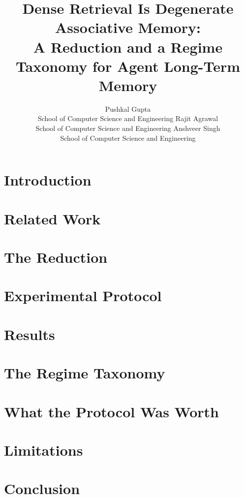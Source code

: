 \documentclass[10pt]{article}
\title{Dense Retrieval Is Degenerate Associative Memory:\\
       A Reduction and a Regime Taxonomy for Agent Long-Term Memory}
\author{\name Pushkal Gupta \\
        \addr School of Computer Science and Engineering
        \AND
        \name Rajit Agrawal \\
        \addr School of Computer Science and Engineering
        \AND
        \name Anshveer Singh \\
        \addr School of Computer Science and Engineering}
\theoremstyle{definition}
\theoremstyle{remark}
\begin{document}
\maketitle

\begin{abstract}

\end{abstract}

\section{Introduction}


\section{Related Work}


\section{The Reduction}


\section{Experimental Protocol}


\section{Results}


\section{The Regime Taxonomy}


\section{What the Protocol Was Worth}


\section{Limitations}


\section{Conclusion}


\makeatletter
\if@accepted
  
\fi
\makeatother




\appendix

\end{document}

